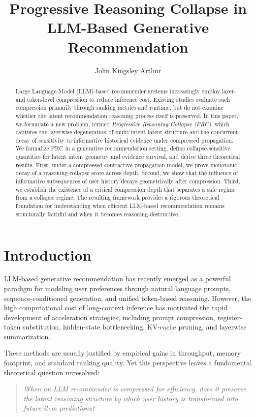 \documentclass[11pt]{article}
\title{\textbf{Progressive Reasoning Collapse in LLM-Based Generative Recommendation}}
\author{John Kingsley Arthur}
\date{}
\begin{document}
\maketitle

\begin{abstract}
Large Language Model (LLM)-based recommender systems increasingly employ layer- and token-level compression to reduce inference cost. Existing studies evaluate such compression primarily through ranking metrics and runtime, but do not examine whether the latent recommendation reasoning process itself is preserved. In this paper, we formulate a new problem, termed \emph{Progressive Reasoning Collapse (PRC)}, which captures the layerwise degeneration of multi-intent latent structure and the concurrent decay of sensitivity to informative historical evidence under compressed propagation. We formalize PRC in a generative recommendation setting, define collapse-sensitive quantities for latent intent geometry and evidence survival, and derive three theoretical results. First, under a compressed contractive propagation model, we prove monotonic decay of a reasoning-collapse score across depth. Second, we show that the influence of informative subsequences of user history decays geometrically after compression. Third, we establish the existence of a critical compression depth that separates a safe regime from a collapse regime. The resulting framework provides a rigorous theoretical foundation for understanding when efficient LLM-based recommendation remains structurally faithful and when it becomes reasoning-destructive.
\end{abstract}

\section{Introduction}

LLM-based generative recommendation has recently emerged as a powerful paradigm for modeling user preferences through natural language prompts, sequence-conditioned generation, and unified token-based reasoning. However, the high computational cost of long-context inference has motivated the rapid development of acceleration strategies, including prompt compression, register-token substitution, hidden-state bottlenecking, KV-cache pruning, and layerwise summarization.

These methods are usually justified by empirical gains in throughput, memory footprint, and standard ranking quality. Yet this perspective leaves a fundamental theoretical question unresolved:
\begin{quote}
\emph{When an LLM recommender is compressed for efficiency, does it preserve the latent reasoning structure by which user history is transformed into future-item predictions?}
\end{quote}
\end{document}
